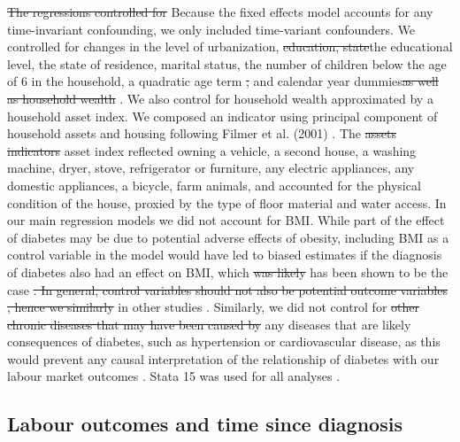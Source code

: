 \documentclass[12pt,english]{article}
\providecommand{\DIFaddtex}[1]{{\protect\color{blue}#1}} %
\providecommand{\DIFdeltex}[1]{{\protect\color{red}\sout{#1}}}                      %
\providecommand{\DIFaddbegin}{} %
\providecommand{\DIFaddend}{} %
\providecommand{\DIFdelbegin}{} %
\providecommand{\DIFdelend}{} %
\providecommand{\DIFadd}[1]{\texorpdfstring{\DIFaddtex{#1}}{#1}} %
\providecommand{\DIFdel}[1]{\texorpdfstring{\DIFdeltex{#1}}{}} %
\begin{document}
\DIFdelbegin \DIFdel{The regressions controlled for }\DIFdelend \DIFaddbegin \DIFadd{Because the fixed effects model accounts for any time-invariant confounding, we only included time-variant confounders. We controlled for changes in the }\DIFaddend level of urbanization, \DIFdelbegin \DIFdel{education, state}\DIFdelend \DIFaddbegin \DIFadd{the educational level, the state of residence}\DIFaddend , marital status, the number of children below the age of 6  in the household, a quadratic age term \DIFdelbegin \DIFdel{, }\DIFdelend \DIFaddbegin \DIFadd{and }\DIFaddend calendar year dummies\DIFdelbegin \DIFdel{as well as household wealth }\DIFdelend \DIFaddbegin \DIFadd{.  We also control for household wealth approximated by a household asset index}\DIFaddend . We composed an indicator using principal component of household assets and housing following Filmer et al. (2001) \parencite{Filmer2001}. The \DIFdelbegin \DIFdel{assets indicators }\DIFdelend \DIFaddbegin \DIFadd{asset index }\DIFaddend reflected owning a vehicle, a second house, a washing machine, dryer, stove, refrigerator or furniture, any electric appliances, any domestic appliances, a bicycle, farm animals, and accounted for the physical condition of the house, proxied by the type of floor material and water access. In our main regression models we did not account for \ac{BMI}. While part of the effect of diabetes may be due to potential adverse effects of obesity, including \ac{BMI} as a control variable in the model would have led to biased estimates if the diagnosis of diabetes also had an effect on \ac{BMI}, which \DIFdelbegin \DIFdel{was likely }\DIFdelend \DIFaddbegin \DIFadd{has been shown }\DIFaddend to be the case \DIFdelbegin %
\DIFdel{. In general, control variables should not also be potential outcome variables }%
\DIFdel{, hence we similarly }\DIFdelend \DIFaddbegin \DIFadd{in other studies }\parencite{Slade2012,DeFineOlivarius2015,Seuring2018}\DIFadd{. Similarly, we }\DIFaddend did not control for \DIFdelbegin \DIFdel{other chronic diseases that may have been caused by }\DIFdelend \DIFaddbegin \DIFadd{any diseases that are likely consequences of }\DIFaddend diabetes, such as hypertension or cardiovascular disease\DIFaddbegin \DIFadd{, as this would prevent any causal interpretation of the relationship of diabetes with our labour market outcomes }\parencite{Angrist2009a}\DIFaddend . Stata 15 was used for all analyses \parencite{StataCorp2017}.


\subsection{Labour outcomes and time since diagnosis}
\end{document}
